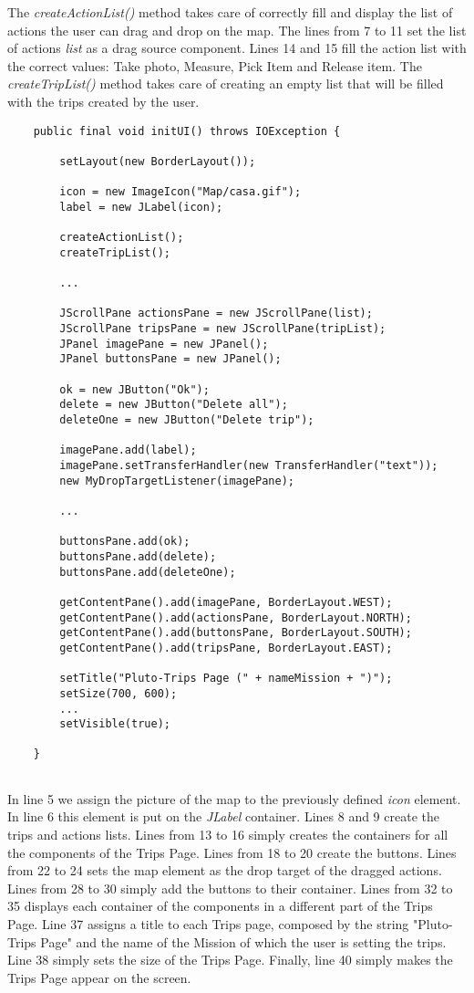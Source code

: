 The \textit{createActionList()} method takes care of correctly fill and display the list of actions the user can drag and drop on the map.
The lines from 7 to 11 set the list of actions \textit{list} as a drag source component.
Lines 14 and 15 fill the action list with the correct values: Take photo, Measure, Pick Item and Release item.
The \textit{createTripList()} method takes care of creating an empty list that will be filled with the trips created by the user.

\begin{lstlisting}
	public final void initUI() throws IOException {

		setLayout(new BorderLayout());

		icon = new ImageIcon("Map/casa.gif");
		label = new JLabel(icon);

		createActionList();
		createTripList();
        
        ...

		JScrollPane actionsPane = new JScrollPane(list);
		JScrollPane tripsPane = new JScrollPane(tripList);
		JPanel imagePane = new JPanel();
		JPanel buttonsPane = new JPanel();

		ok = new JButton("Ok");
		delete = new JButton("Delete all");
		deleteOne = new JButton("Delete trip");

		imagePane.add(label);
		imagePane.setTransferHandler(new TransferHandler("text"));
		new MyDropTargetListener(imagePane);
        
		...

		buttonsPane.add(ok);
		buttonsPane.add(delete);
		buttonsPane.add(deleteOne);

		getContentPane().add(imagePane, BorderLayout.WEST);
		getContentPane().add(actionsPane, BorderLayout.NORTH);
		getContentPane().add(buttonsPane, BorderLayout.SOUTH);
		getContentPane().add(tripsPane, BorderLayout.EAST);

		setTitle("Pluto-Trips Page (" + nameMission + ")");
		setSize(700, 600);
        ...
		setVisible(true);

	}
    
\end{lstlisting}

In line 5 we assign the picture of the map to the previously defined \textit{icon} element.
In line 6 this element is put on the \textit{JLabel} container.
Lines 8 and 9 create the trips and actions lists.
Lines from 13 to 16 simply creates the containers for all the components of the Trips Page.
Lines from 18 to 20 create the buttons.
Lines from 22 to 24 sets the map element as the drop target of the dragged actions.
Lines from 28 to 30 simply add the buttons to their container.
Lines from 32 to 35 displays each container of the components in a different part of the Trips Page.
Line 37 assigns a title to each Trips page, composed by the string "Pluto-Trips Page" and the name of the Mission of which the user is setting the trips.
Line 38 simply sets the size of the Trips Page.
Finally, line 40 simply makes the Trips Page appear on the screen.
\\

